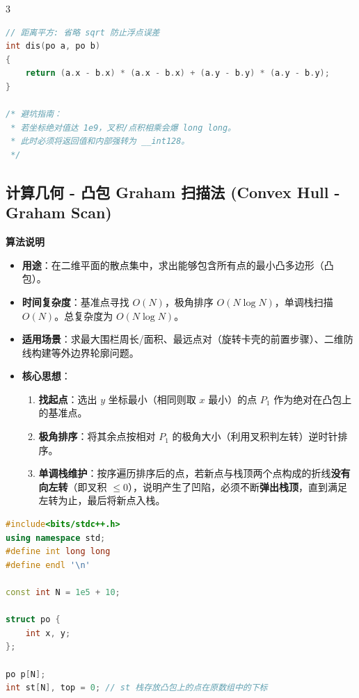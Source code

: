 \documentclass[10pt,landscape,a4paper]{article}
\begin{document}
\begin{multicols*}{3}
\begin{lstlisting}[language=C++]
// 距离平方: 省略 sqrt 防止浮点误差
int dis(po a, po b)
{
    return (a.x - b.x) * (a.x - b.x) + (a.y - b.y) * (a.y - b.y);
}

/* 避坑指南：
 * 若坐标绝对值达 1e9，叉积/点积相乘会爆 long long。
 * 此时必须将返回值和内部强转为 __int128。
 */
\end{lstlisting}
\subsection*{计算几何 - 凸包 Graham 扫描法 (Convex Hull - Graham Scan)}
\par\addvspace{0.7ex}\noindent\textbf{算法说明}\par\nobreak
\begin{itemize}
\item \textbf{用途}：在二维平面的散点集中，求出能够包含所有点的最小凸多边形（凸包）。
\item \textbf{时间复杂度}：基准点寻找 $O(N)$，极角排序 $O(N \log N)$，单调栈扫描 $O(N)$。总复杂度为 $O(N \log N)$。
\item \textbf{适用场景}：求最大围栏周长/面积、最远点对（旋转卡壳的前置步骤）、二维防线构建等外边界轮廓问题。
\item \textbf{核心思想}：
\begin{enumerate}[start=1]
\item \textbf{找起点}：选出 $y$ 坐标最小（相同则取 $x$ 最小）的点 $P_1$ 作为绝对在凸包上的基准点。
\item \textbf{极角排序}：将其余点按相对 $P_1$ 的极角大小（利用叉积判左转）逆时针排序。
\item \textbf{单调栈维护}：按序遍历排序后的点，若新点与栈顶两个点构成的折线\textbf{没有向左转}（即叉积 $\le 0$），说明产生了凹陷，必须不断\textbf{弹出栈顶}，直到满足左转为止，最后将新点入栈。
\end{enumerate}
\end{itemize}
\par{}\par
\begin{lstlisting}[language=C++]
#include<bits/stdc++.h>
using namespace std;
#define int long long
#define endl '\n'

const int N = 1e5 + 10;

struct po {
    int x, y;
};

po p[N];
int st[N], top = 0; // st 栈存放凸包上的点在原数组中的下标


\end{lstlisting}
\end{multicols*}
\end{document}

